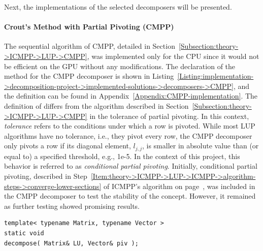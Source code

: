 Next, the implementations of the selected decomposers will be presented.

\paragraph{Crout's Method with Partial Pivoting (CMPP)}\label{Paragraph:implementation->decomposition-project->implemented-solutions->decomposers->CMPP}
The sequential algorithm of CMPP, detailed in Section~\ref{Subsection:theory->ICMPP->LUP->CMPP}, was implemented only for the CPU since it would not be efficient on the GPU without any modifications.
The declaration of the  method for the CMPP decomposer is shown in Listing~\ref{Listing:implementation->decomposition-project->implemented-solutions->decomposers->CMPP}, and the definition can be found in Appendix~\ref{Appendix:CMPP-implementation}.
The definition of  differs from the algorithm described in Section~\ref{Subsection:theory->ICMPP->LUP->CMPP} in the tolerance of partial pivoting.
In this context, \textit{tolerance} refers to the conditions under which a row is pivoted.
While most LUP algorithms have no tolerance, i.e., they pivot every row, the CMPP decomposer only pivots a row if its diagonal element, $l_{j,j}$, is smaller in absolute value than (or equal to) a specified threshold, e.g., 1e-5.
In the context of this project, this behavior is referred to as \textit{conditional partial pivoting}.
Initially, conditional partial pivoting, described in Step~\ref{Item:theory->ICMPP->LUP->ICMPP->algorithm-steps->converge-lower-sections} of ICMPP's algorithm on page~\pageref{Item:theory->ICMPP->LUP->ICMPP->algorithm-steps->converge-lower-sections}, was included in the CMPP decomposer to test the stability of the concept.
However, it remained as further testing showed promising results.

\begin{lstlisting}[caption={The declaration of the \code{decompose()} method for the CMPP decomposer.
On input, matrix \code{LU} is assumed to contain the values of $\mathbf{A}$, and \code{piv} is expected to be appropriately sized.
On output, matrix \code{LU} contains the values of matrices $\mathbf{L}$ and $\mathbf{U}$ in the format presented in Equation~\ref{Equation:implementation->decomposition-project->implemented-solutions->decomposers->CMPP}, and \code{piv} contains the row permutations in the format set by cuSOLVER and cuBLAS, i.e., row \code{i} was swapped with row \code{piv[ i ]} \cite{5D33zKi5iStCty0r}.
The template parameters, \code{Matrix} and \code{Vector}, are expected to be data structures from TNL that inherit from the \code{TNL::Matrices::DenseMatrix} and \code{TNL::Containers::Vector} types, respectively.},label={Listing:implementation->decomposition-project->implemented-solutions->decomposers->CMPP}]
template< typename Matrix, typename Vector >
static void
decompose( Matrix& LU, Vector& piv );
\end{lstlisting}

